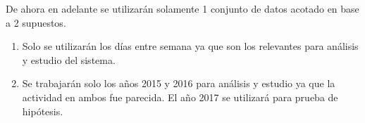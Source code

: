 \documentclass[12pt,spanish]{article}
\begin{document}
	\begin{figure}[H]
		\begin{floatrow}
		\end{floatrow}
	\end{figure}

	De ahora en adelante se utilizarán solamente 1 conjunto de datos acotado en base a 2 supuestos.
	\begin{enumerate}
		\item Solo se utilizarán los días entre semana ya que son los relevantes para análisis y estudio del sistema.
		\item Se trabajarán solo los años 2015 y 2016 para análisis y estudio ya que la actividad en ambos fue parecida. El año 2017 se utilizará para prueba de hipótesis.
	\end{enumerate}
\end{document}
